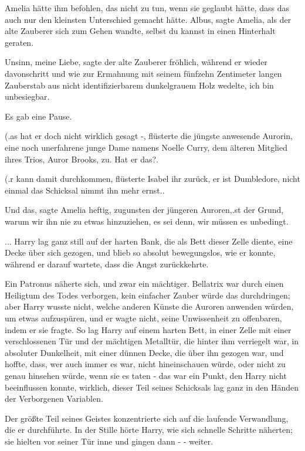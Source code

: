 Amelia hätte ihm befohlen, das nicht zu tun, wenn sie geglaubt hätte, dass das
auch nur den kleinsten Unterschied gemacht hätte. \glqq{}Albus\grqq{}, sagte
Amelia, als der alte Zauberer sich zum Gehen wandte, \glqq{}selbst du kannst in
einen Hinterhalt geraten.\grqq{}

\glqq{}Unsinn, meine Liebe\grqq{}, sagte der alte Zauberer fröhlich, während er
wieder davonschritt und wie zur Ermahnung mit seinem fünfzehn Zentimeter langen
Zauberstab aus nicht identifizierbarem dunkelgrauem Holz wedelte, \glqq{}ich bin
unbesiegbar.\grqq{}

Es gab eine Pause.

(\grqq{}.as hat er doch nicht wirklich gesagt -\grqq{}, flüsterte die jüngste
anwesende Aurorin, eine noch unerfahrene junge Dame namens Noelle Curry, dem
älteren Mitglied ihres Trios, Auror Brooks, zu. \glqq{}Hat er das?\grqq{}.

(\grqq{}.r kann damit durchkommen\grqq{}, flüsterte Isabel ihr zurück, \glqq{}er
ist Dumbledore, nicht einmal das Schicksal nimmt ihn mehr ernst.\grqq{}.

\glqq{}Und das\grqq{}, sagte Amelia heftig, zugunsten der jüngeren
Auroren,\grqq{}.st der Grund, warum wir ihn nie zu etwas hinzuziehen, es sei
denn, wir müssen es unbedingt.\grqq{}

... Harry lag ganz still auf der harten Bank, die als Bett dieser Zelle diente,
eine Decke über sich gezogen, und blieb so absolut bewegungslos, wie er konnte,
während er darauf wartete, dass die Angst zurückkehrte.

Ein Patronus näherte sich, und zwar ein mächtiger. Bellatrix war durch einen
Heiligtum des Todes verborgen, kein einfacher Zauber würde das durchdringen;
aber Harry wusste nicht, welche anderen Künste die Auroren anwenden würden, um
etwas aufzuspüren, und er wagte nicht, seine Unwissenheit zu offenbaren, indem
er sie fragte. So lag Harry auf einem harten Bett, in einer Zelle mit einer
verschlossenen Tür und der mächtigen Metalltür, die hinter ihm verriegelt war,
in absoluter Dunkelheit, mit einer dünnen Decke, die über ihn gezogen war, und
hoffte, dass, wer auch immer es war, nicht hineinschauen würde, oder nicht zu
genau hinsehen würde, wenn sie es taten - das war ein Punkt, den Harry nicht
beeinflussen konnte, wirklich, dieser Teil seines Schicksals lag ganz in den
Händen der Verborgenen Variablen.

Der größte Teil seines Geistes konzentrierte sich auf die laufende Verwandlung,
die er durchführte. In der Stille hörte Harry, wie sich schnelle Schritte
näherten; sie hielten vor seiner Tür inne und gingen dann - - weiter.

